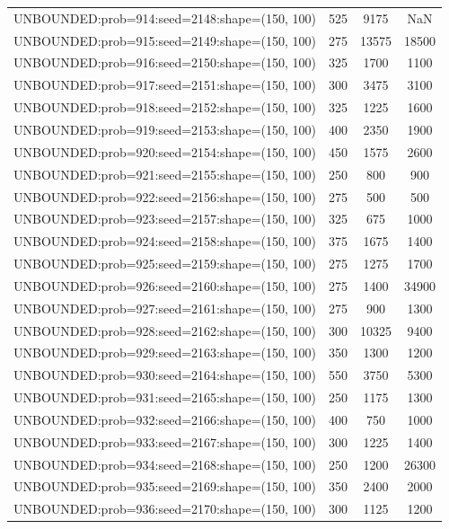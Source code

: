 \begin{longtable}{lccc}
UNBOUNDED:prob=914:seed=2148:shape=(150, 100) &      525 &  9175 &    NaN \\
UNBOUNDED:prob=915:seed=2149:shape=(150, 100) &      275 & 13575 &  18500 \\
UNBOUNDED:prob=916:seed=2150:shape=(150, 100) &      325 &  1700 &   1100 \\
UNBOUNDED:prob=917:seed=2151:shape=(150, 100) &      300 &  3475 &   3100 \\
UNBOUNDED:prob=918:seed=2152:shape=(150, 100) &      325 &  1225 &   1600 \\
UNBOUNDED:prob=919:seed=2153:shape=(150, 100) &      400 &  2350 &   1900 \\
UNBOUNDED:prob=920:seed=2154:shape=(150, 100) &      450 &  1575 &   2600 \\
UNBOUNDED:prob=921:seed=2155:shape=(150, 100) &      250 &   800 &    900 \\
UNBOUNDED:prob=922:seed=2156:shape=(150, 100) &      275 &   500 &    500 \\
UNBOUNDED:prob=923:seed=2157:shape=(150, 100) &      325 &   675 &   1000 \\
UNBOUNDED:prob=924:seed=2158:shape=(150, 100) &      375 &  1675 &   1400 \\
UNBOUNDED:prob=925:seed=2159:shape=(150, 100) &      275 &  1275 &   1700 \\
UNBOUNDED:prob=926:seed=2160:shape=(150, 100) &      275 &  1400 &  34900 \\
UNBOUNDED:prob=927:seed=2161:shape=(150, 100) &      275 &   900 &   1300 \\
UNBOUNDED:prob=928:seed=2162:shape=(150, 100) &      300 & 10325 &   9400 \\
UNBOUNDED:prob=929:seed=2163:shape=(150, 100) &      350 &  1300 &   1200 \\
UNBOUNDED:prob=930:seed=2164:shape=(150, 100) &      550 &  3750 &   5300 \\
UNBOUNDED:prob=931:seed=2165:shape=(150, 100) &      250 &  1175 &   1300 \\
UNBOUNDED:prob=932:seed=2166:shape=(150, 100) &      400 &   750 &   1000 \\
UNBOUNDED:prob=933:seed=2167:shape=(150, 100) &      300 &  1225 &   1400 \\
UNBOUNDED:prob=934:seed=2168:shape=(150, 100) &      250 &  1200 &  26300 \\
UNBOUNDED:prob=935:seed=2169:shape=(150, 100) &      350 &  2400 &   2000 \\
UNBOUNDED:prob=936:seed=2170:shape=(150, 100) &      300 &  1125 &   1200 \\

\end{longtable}
